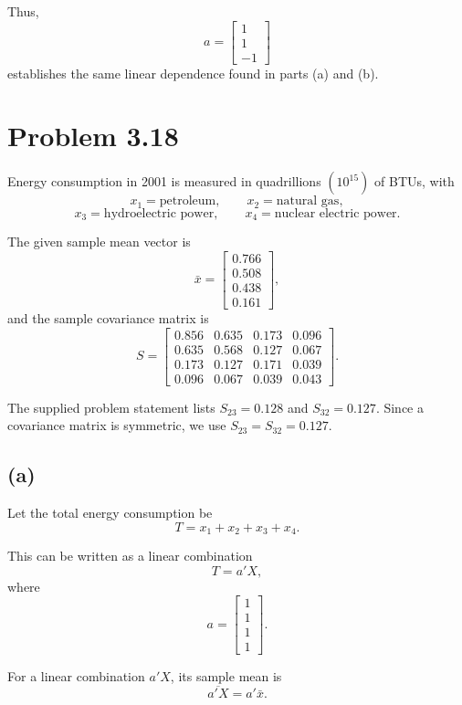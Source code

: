 \documentclass[12pt]{article}
\begin{document}
	Thus,
	\[
	\boxed{
		a=
		\begin{bmatrix}
			1\\1\\-1
	\end{bmatrix}}
	\]
	establishes the same linear dependence found in parts (a)
	and (b).
	
	\section*{Problem 3.18}
	
	Energy consumption in 2001 is measured in quadrillions
	\((10^{15})\) of BTUs, with
	\[
	x_1=\text{petroleum},\qquad
	x_2=\text{natural gas},
	\]
	\[
	x_3=\text{hydroelectric power},\qquad
	x_4=\text{nuclear electric power}.
	\]
	
	The given sample mean vector is
	\[
	\bar{x}
	=
	\begin{bmatrix}
		0.766\\
		0.508\\
		0.438\\
		0.161
	\end{bmatrix},
	\]
	and the sample covariance matrix is
	\[
	S=
	\begin{bmatrix}
		0.856&0.635&0.173&0.096\\
		0.635&0.568&0.127&0.067\\
		0.173&0.127&0.171&0.039\\
		0.096&0.067&0.039&0.043
	\end{bmatrix}.
	\]
	
	The supplied problem statement lists \(S_{23}=0.128\) and
	\(S_{32}=0.127\). Since a covariance matrix is symmetric,
	we use \(S_{23}=S_{32}=0.127\).
	
	\subsection*{(a)}
	
	Let the total energy consumption be
	\[
	T=x_1+x_2+x_3+x_4.
	\]
	
	This can be written as a linear combination
	\[
	T=a'X,
	\]
	where
	\[
	a=
	\begin{bmatrix}
		1\\
		1\\
		1\\
		1
	\end{bmatrix}.
	\]
	
	For a linear combination \(a'X\), its sample mean is
	\[
	\overline{a'X}=a'\bar{x}.
	\]
	
\end{document}
